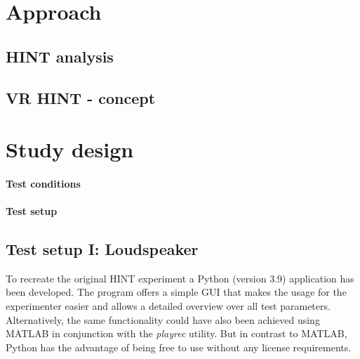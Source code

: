 \documentclass[a4paper,11pt]{article}%
\renewcommand{\\}{\vspace*{0.5\baselineskip} \newline}
\begin{document}
{{\section{Approach}

\subsection{HINT analysis}

\subsection{VR HINT - concept}

\section{Study design}

\paragraph{Test conditions}

\paragraph{Test setup}

\subsection{Test setup I: Loudspeaker}
To recreate the original \ac{HINT} experiment a Python (version 3.9) application has been developed. The program offers a simple \ac{GUI} that makes the usage for the experimenter easier and allows a detailed overview over all test parameters. Alternatively, the same functionality could have also been achieved using MATLAB in conjunction with the \textit{playrec} utility. But in contrast to MATLAB, Python has the advantage of being free to use without any license requirements.

}}
\end{document}
